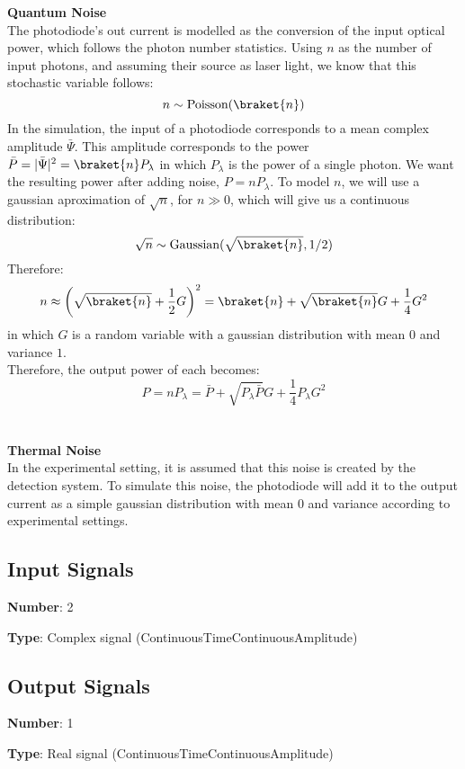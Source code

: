 \documentclass[../../sdf/tex/BPSK_system.tex]{subfiles}
\begin{document}
{\bf Quantum Noise}\\
The photodiode's out current is modelled as the conversion of the input optical power, which follows the photon number statistics. Using $n$ as the number of input photons, and assuming their source as laser light, we know that this stochastic variable follows:
%
\begin{equation}
n \sim \textrm{Poisson}(\braket{n})
\end{equation}
%
In the simulation, the input of a photodiode corresponds to a mean complex amplitude $\bar{\Psi}$. This amplitude corresponds to the power $\bar{P} = |\bar{\Psi}|^2 = \braket{n}P_\lambda$ in which $P_\lambda$ is the power of a single photon. We want the resulting power after adding noise, $P = n P_\lambda$. To model $n$, we will use a gaussian aproximation of $\sqrt{n}$, for $n \gg 0$, which will give us a continuous distribution:
%
\begin{equation}
\sqrt{n} \sim \textrm{Gaussian}(\sqrt{\braket{n}}, 1/2)
\end{equation}
%
Therefore:
%
\begin{equation}
n \approx \left( \sqrt{\braket{n}} + \frac{1}{2}G \right)^2 = \braket{n} + \sqrt{\braket{n}} G + \frac{1}{4} G^2
\end{equation}
%
in which $G$ is a random variable with a gaussian distribution with mean $0$ and variance $1$.\\
Therefore, the output power of each becomes:
%
\begin{equation}
P = n P_\lambda = \bar{P} + \sqrt{P_\lambda \bar{P}} G + \frac{1}{4} P_\lambda G^2
\end{equation}
%
\\
\\
{\bf Thermal Noise}\\
In the experimental setting, it is assumed that this noise is created by the detection system. To simulate this noise, the photodiode will add it to the output current as a simple gaussian distribution with mean $0$ and variance according to experimental settings.\\

\subsection*{Input Signals}

\textbf{Number}: 2

\textbf{Type}: Complex signal (ContinuousTimeContinuousAmplitude)

\subsection*{Output Signals}

\textbf{Number}: 1

\textbf{Type}: Real signal (ContinuousTimeContinuousAmplitude)
\end{document}
